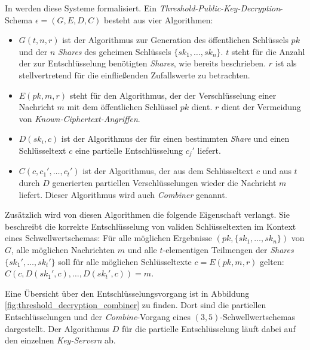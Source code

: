 In \cite{boneh2016} werden diese Systeme formalisiert. Ein \textit{Threshold-Public-Key-Decryption}-Schema \(\epsilon = (G, E, D, C)\) besteht aus vier Algorithmen: 

\begin{itemize}
  \item \(G(t, n, r)\) ist der Algorithmus zur Generation des öffentlichen Schlüssels \(pk\) und der \(n\) \textit{Shares} des geheimen Schlüssels \(\{sk_1, \dots, sk_n\}\). \(t\) steht für die Anzahl der zur Entschlüsselung benötigten \textit{Shares}, wie bereits beschrieben. \(r\) ist als stellvertretend für die einfließenden Zufallswerte zu betrachten.
  
  \item \(E(pk, m, r)\) steht für den Algorithmus, der der Verschlüsselung einer Nachricht \(m\) mit dem öffentlichen Schlüssel \(pk\) dient. \(r\) dient der Vermeidung von \textit{Known-Ciphertext-Angriffen}. 
  
  \item \(D(sk_i, c)\) ist der Algorithmus der für einen bestimmten \textit{Share} und einen Schlüsseltext \(c\) eine partielle Entschlüsselung \(c_j'\) liefert.
  
  \item \(C(c, c_1', \dots, c_t')\) ist der Algorithmus, der aus dem Schlüsseltext \(c\) und aus \(t\) durch \(D\) generierten partiellen Verschlüsselungen wieder die Nachricht \(m\) liefert. Dieser Algorithmus wird auch \textit{Combiner} genannt. 
\end{itemize}

Zusätzlich wird von diesen Algorithmen die folgende Eigenschaft verlangt. Sie beschreibt die korrekte Entschlüsselung von validen Schlüsseltexten im Kontext eines Schwellwertschemas: Für alle möglichen Ergebnisse \((pk, \{sk_1, \dots, sk_n\})\) von \(G\), alle möglichen Nachrichten \(m\) und alle \(t\)-elementigen Teilmengen der \textit{Shares} \(\{sk_1', \dots, sk_t'\}\) soll für alle möglichen Schlüsseltexte \(c=E(pk, m, r)\) gelten: \(C(c, D(sk_1', c), \dots, D(sk_t', c)) = m\).

Eine Übersicht über den Entschlüsselungsvorgang ist in Abbildung \ref{fig:threshold_decryption_combiner} zu finden. Dort sind die partiellen Entschlüsselungen und der \textit{Combine}-Vorgang eines \((3,5)\)-Schwellwertschemas dargestellt. Der Algorithmus \(D\) für die partielle Entschlüsselung läuft dabei auf den einzelnen \textit{Key-Servern} ab.

